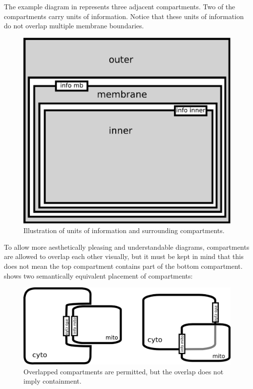 The example diagram in  represents three adjacent compartments.  Two of the compartments carry units of information.  Notice that these units of information do not overlap multiple membrane boundaries.

\begin{figure}[H]
  \centering
  \includegraphics[scale = 0.4]{examples/compartment-3comp}
  \caption{Illustration of units of information and surrounding compartments.}
  \label{fig:three-comp}
\end{figure}

To allow more aesthetically pleasing and understandable diagrams, compartments are allowed to overlap each other visually, but it must be kept in mind that this does not mean the top compartment contains part of the bottom compartment.   shows two semantically equivalent placement of compartments:

\begin{figure}[H]
  \centering
  \includegraphics[scale = 0.4]{examples/compartment_overlapping}
  \caption{Overlapped compartments are permitted, but the overlap does not imply containment.}
  \label{fig:overlap}
\end{figure}

